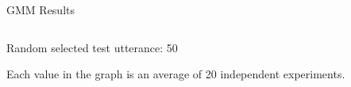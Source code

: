 \begin{frame}{GMM Results}
\begin{columns}[t]
\begin{column}[t]{0.5\textwidth}
\begin{center}
        Random selected test utterance: 50

        Each value in the graph is an average of 20 independent experiments.
      \end{center}
    \end{column}
  \end{columns}
\end{frame}

